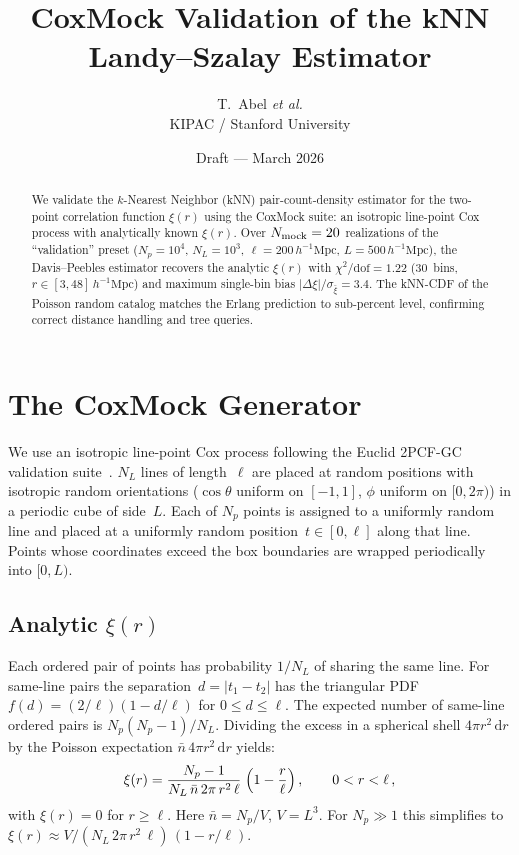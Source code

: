 \documentclass[11pt]{article}
\title{CoxMock Validation of the kNN Landy--Szalay Estimator}
\author{T.\ Abel \textit{et al.}\\ KIPAC / Stanford University}
\date{Draft --- March 2026}
\begin{document}
\maketitle

\begin{abstract}
We validate the $k$-Nearest Neighbor (kNN) pair-count-density estimator for
the two-point correlation function $\xi(r)$ using the CoxMock suite: an
isotropic line-point Cox process with analytically known $\xi(r)$.  Over
$N_{\rm mock} = 20$ realizations of the ``validation'' preset ($N_p = 10^4$,
$N_L = 10^3$, $\ell = 200\,h^{-1}\mathrm{Mpc}$, $L = 500\,h^{-1}\mathrm{Mpc}$),
the Davis--Peebles estimator recovers the analytic $\xi(r)$ with
$\chi^2/\mathrm{dof} = 1.22$ (30~bins, $r \in [3, 48]\,h^{-1}\mathrm{Mpc}$)
and maximum single-bin bias $\lvert\Delta\xi\rvert/\sigma_{\bar\xi} = 3.4$.
The kNN-CDF of the Poisson random catalog matches the Erlang prediction to
sub-percent level, confirming correct distance handling and tree queries.
\end{abstract}

\section{The CoxMock Generator}

We use an isotropic line-point Cox process following the Euclid 2PCF-GC
validation suite~\citep{delaTorre2025}.  $N_L$ lines of length~$\ell$ are
placed at random positions with isotropic random orientations
($\cos\theta$ uniform on $[-1,1]$, $\phi$ uniform on $[0,2\pi)$) in a
periodic cube of side~$L$.  Each of $N_p$ points is assigned to a
uniformly random line and placed at a uniformly random position~$t \in
[0,\ell]$ along that line.  Points whose coordinates exceed the box
boundaries are wrapped periodically into $[0, L)$.

\subsection{Analytic $\xi(r)$}

Each ordered pair of points has probability $1/N_L$ of sharing the same
line.  For same-line pairs the separation~$d = |t_1 - t_2|$ has the
triangular PDF~$f(d) = (2/\ell)(1 - d/\ell)$ for $0 \le d \le \ell$.
The expected number of same-line ordered pairs is
$N_p(N_p - 1)/N_L$.  Dividing the excess in a spherical shell $4\pi
r^2\,\mathrm{d}r$ by the Poisson expectation $\bar{n}\,4\pi
r^2\,\mathrm{d}r$ yields:
\begin{equation}
  \xi(r)
    = \frac{N_p - 1}{N_L\,\bar{n}\,2\pi\,r^2\,\ell}
      \;\Bigl(1 - \frac{r}{\ell}\Bigr)\,,
  \qquad 0 < r < \ell\,,
  \label{eq:xi_cox}
\end{equation}
with $\xi(r) = 0$ for $r \ge \ell$.  Here $\bar{n} = N_p/V$,
$V = L^3$.  For $N_p \gg 1$ this simplifies to $\xi(r) \approx V/(N_L\,
2\pi\,r^2\,\ell)\,(1 - r/\ell)$.
\end{document}
